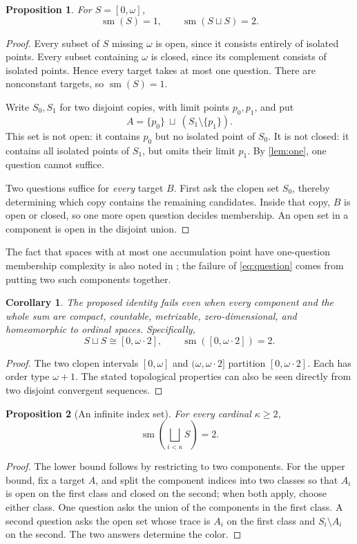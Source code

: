 \documentclass[11pt,letterpaper]{article}
\numberwithin{equation}{section}
\newtheorem{proposition}[proposition]{Proposition}
\newtheorem{corollary}[corollary]{Corollary}
\theoremstyle{definition}
\theoremstyle{remark}
\newcommand{\sm}{\operatorname{sm}}
\newcommand{\bigsqsum}{\bigsqcup}
\begin{document}
\begin{proposition}\label{prop:small}
For $S=[0,\omega]$,
\begin{equation}\label{eq:small}
 \sm(S)=1,\qquad \sm(S\sqcup S)=2.
\end{equation}
\end{proposition}
\begin{proof}
Every subset of $S$ missing $\omega$ is open, since it consists entirely of
isolated points. Every subset containing $\omega$ is closed, since its complement
consists of isolated points. Hence every target takes at most one question.
There are nonconstant targets, so $\sm(S)=1$.

Write $S_0,S_1$ for two disjoint copies, with limit points $p_0,p_1$, and put
\[
 A=\{p_0\}\ \sqcup\ (S_1\setminus\{p_1\}).
\]
This set is not open: it contains $p_0$ but no isolated point of $S_0$.
It is not closed: it contains all isolated points of $S_1$, but omits their
limit $p_1$. By \cref{lem:one}, one question cannot suffice.

Two questions suffice for \emph{every} target $B$. First ask the clopen set
$S_0$, thereby determining which copy contains the remaining candidates.
Inside that copy, $B$ is open or closed, so one more open question decides
membership. An open set in a component is open in the disjoint union.
\end{proof}

The fact that spaces with at most one accumulation point have one-question
membership complexity is also noted in \cite[Section 7]{CCS}; the failure of
\eqref{eq:question} comes from putting two such components together.

\begin{corollary}
The proposed identity fails even when every component and the whole sum are
compact, countable, metrizable, zero-dimensional, and homeomorphic to ordinal
spaces. Specifically,
\[
 S\sqcup S\cong[0,\omega\cdot2],
 \qquad \sm([0,\omega\cdot2])=2.
\]
\end{corollary}
\begin{proof}
The two clopen intervals $[0,\omega]$ and $(\omega,\omega\cdot2]$ partition
$[0,\omega\cdot2]$. Each has order type $\omega+1$. The stated topological
properties can also be seen directly from two disjoint convergent sequences.
\end{proof}

\begin{proposition}[An infinite index set]
For every cardinal $\kappa\geq2$,
\[
 \sm\!\left(\bigsqsum_{i<\kappa}S\right)=2.
\]
\end{proposition}
\begin{proof}
The lower bound follows by restricting to two components. For the upper bound,
fix a target $A$, and split the component indices into two classes so that $A_i$
is open on the first class and closed on the second; when both apply, choose
either class. One question asks the union of the components in the first class.
A second question asks the open set whose trace is $A_i$ on the first class and
$S_i\setminus A_i$ on the second. The two answers determine the color.
\end{proof}
\end{document}
